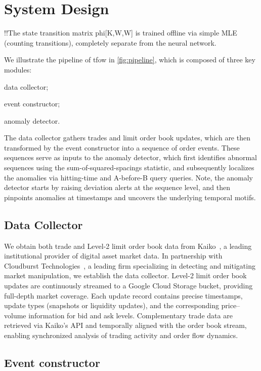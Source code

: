 
\section{System Design}

!!The state transition matrix phi[K,W,W] is trained offline via simple MLE (counting transitions), completely separate from the neural network.


We illustrate the pipeline of \ac{tfow} in \autoref{fig:pipeline}, which is composed of three key modules: 
\begin{enumerate*}[label={(\roman*)}]
    \item data collector;
    \item event constructor;
    \item anomaly detector. 
\end{enumerate*}
The data collector gathers trades and limit order book updates, which are then transformed by the event constructor into a sequence of order events. These sequences serve as inputs to the anomaly detector, which first identifies abnormal sequences using the sum-of-squared-spacings statistic, and subsequently localizes the anomalies via hitting-time and A-before-B query queries. Note, the anomaly detector starts by raising deviation alerts at the sequence level, and then pinpoints anomalies at timestamps and uncovers the underlying temporal motifs.



\subsection{Data Collector}
We obtain both trade and Level-2 limit order book data from Kaiko~\cite{Kaiko2025TheKaiko}, a leading institutional provider of digital asset market data. In partnership with Cloudburst Technologies~\cite{Cloudburst2025CloudburstTechnologies}, a leading firm specializing in detecting and mitigating market manipulation, we establish the data collector. Level-2 limit order book updates are continuously streamed to a Google Cloud Storage bucket, providing full-depth market coverage. Each update record contains precise timestamps, update types (snapshots or liquidity updates), and the corresponding price–volume information for bid and ask levels. Complementary trade data are retrieved via Kaiko’s API and temporally aligned with the order book stream, enabling synchronized analysis of trading activity and order flow dynamics.




\subsection{Event constructor}
\label{subsec:event-construction}



